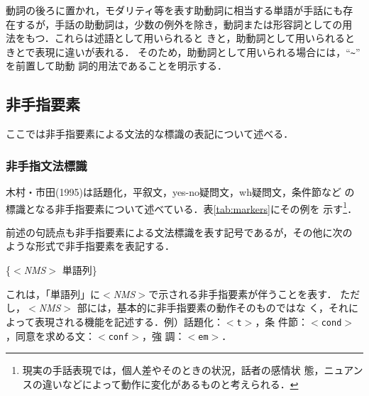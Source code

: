 動詞の後ろに置かれ，モダリティ等を表す助動詞に相当する単語が手話にも存
在するが，手話の助動詞は，少数の例外を除き，動詞または形容詞としての用
法をもつ\cite{Ichida2000,Matsumoto2001}．これらは述語として用いられると
きと，助動詞として用いられるときとで表現に違いが表れる\cite{Kimura1995}．
そのため，助動詞として用いられる場合には，``\verb+~+'' を前置して助動
詞的用法であることを明示する．

\subsection{非手指要素}
\label{sec:nms}

ここでは非手指要素による文法的な標識の表記について述べる．

\subsubsection*{非手指文法標識}

木村・市田(1995)は話題化，平叙文，yes-no疑問文，wh疑問文，条件節など
の標識となる非手指要素について述べている．表\ref{tab:markers}にその例を
示す\footnote{現実の手話表現では，個人差やそのときの状況，話者の感情状
  態，ニュアンスの違いなどによって動作に変化があるものと考えられる．}．

前述の句読点も非手指要素による文法標識を表す記号であるが，その他に次の
ような形式で非手指要素を表記する．

\begin{ex}
  \{$<${\it NMS}$>$ 単語列\}
\end{ex}

これは，「単語列」に$<${\it NMS}$>$で示される非手指要素が伴うことを表す．
ただし，$<${\it NMS}$>$ 部には，基本的に非手指要素の動作そのものではな
く，それによって表現される機能を記述する．例）話題化：$<${\tt t}$>$，条
件節：$<${\tt cond}$>$，同意を求める文：$<${\tt conf}$>$，強
調：$<${\tt em}$>$．

